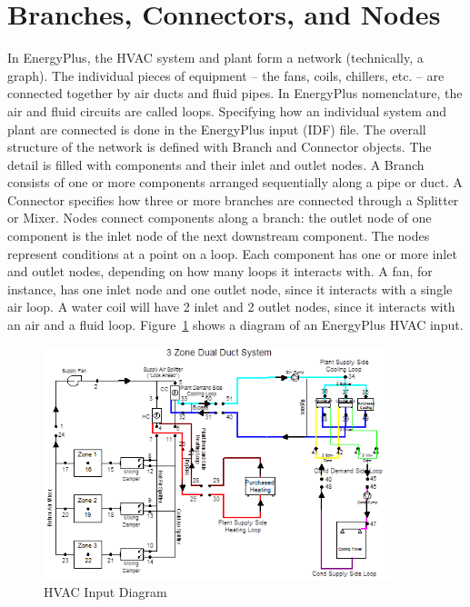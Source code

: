 \section{Branches, Connectors, and Nodes}\label{branches-connectors-and-nodes}

In EnergyPlus, the HVAC system and plant form a network (technically, a graph). The individual pieces of equipment -- the fans, coils, chillers, etc. -- are connected together by air ducts and fluid pipes. In EnergyPlus nomenclature, the air and fluid circuits are called loops. Specifying how an individual system and plant are connected is done in the EnergyPlus input (IDF) file. The overall structure of the network is defined with Branch and Connector objects. The detail is filled with components and their inlet and outlet nodes. A Branch consists of one or more components arranged sequentially along a pipe or duct. A Connector specifies how three or more branches are connected through a Splitter or Mixer. Nodes connect components along a branch: the outlet node of one component is the inlet node of the next downstream component. The nodes represent conditions at a point on a loop. Each component has one or more inlet and outlet nodes, depending on how many loops it interacts with. A fan, for instance, has one inlet node and one outlet node, since it interacts with a single air loop. A water coil will have 2 inlet and 2 outlet nodes, since it interacts with an air and a fluid loop. Figure~\ref{fig:hvac-input-diagram} shows a diagram of an EnergyPlus HVAC input.

\begin{figure}[hbtp] %
\centering
\includegraphics[width=0.9\textwidth, height=0.9\textheight, keepaspectratio=true]{media/image002.png}
\caption{  HVAC Input Diagram \protect \label{fig:hvac-input-diagram}}
\end{figure}

